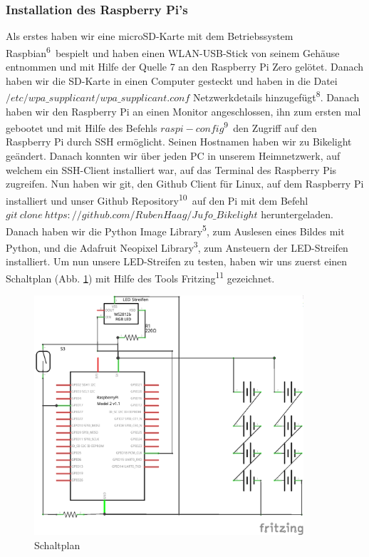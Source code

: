 \documentclass [a4paper, 11pt] {article}
\begin{document}
\subsubsection{Installation des Raspberry Pi{'}s}
Als erstes haben wir eine microSD-Karte mit dem Betriebssystem Raspbian\textsuperscript{6}\ bespielt und haben einen WLAN-USB-Stick von seinem Gehäuse entnommen und mit Hilfe der Quelle 7 an den Raspberry Pi Zero gelötet. Danach haben wir die SD-Karte in einen Computer gesteckt und haben in die Datei {$/etc/wpa\_supplicant/wpa\_supplicant.conf$} Netzwerkdetails hinzugefügt\textsuperscript{8}.
Danach haben wir den Raspberry Pi an einen Monitor angeschlossen, ihn zum ersten mal gebootet und mit Hilfe des Befehls {$raspi-config$}\textsuperscript{9}\ den Zugriff auf den Raspberry Pi durch SSH ermöglicht. Seinen Hostnamen haben wir zu Bikelight geändert. Danach konnten wir über jeden PC in unserem Heimnetzwerk, auf welchem ein SSH-Client installiert war, auf das Terminal des Raspberry Pis zugreifen.
Nun haben wir git, den Github Client für Linux, auf dem Raspberry Pi installiert und unser Github Repository\textsuperscript{10}\ auf den Pi mit dem Befehl {$git\ clone\ https://github.com/ RubenHaag/Jufo\_Bikelight$} heruntergeladen. Danach haben wir die Python Image Library\textsuperscript{5}, zum Auslesen eines Bildes mit Python, und die Adafruit Neopixel Library\textsuperscript{3}, zum Ansteuern der LED-Streifen installiert. Um nun unsere LED-Streifen zu testen, haben wir uns zuerst einen Schaltplan (Abb. \ref{Schaltplan}) mit Hilfe des Tools Fritzing\textsuperscript{11} gezeichnet.\\
\begin{figure}[H]
	\centering
	\includegraphics[width=10cm]{u.png}
	\caption{Schaltplan}
	\label{Schaltplan}
\end{figure}
\end{document}
